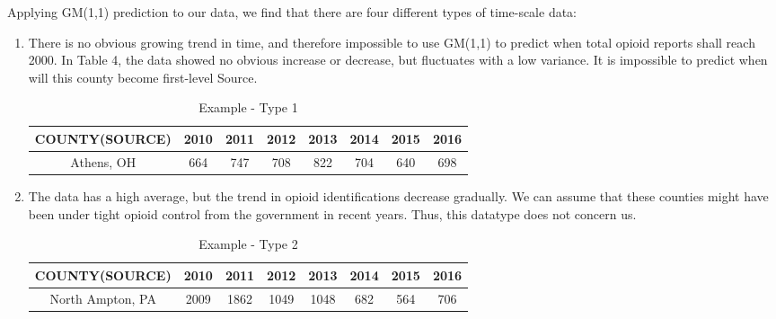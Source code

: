 Applying GM(1,1) prediction to our data, we find that there are four different types of time-scale data:
\begin{enumerate}
	\item There is no obvious growing trend in time, and therefore impossible to use GM(1,1) to predict when total opioid reports shall reach 2000. In Table 4, the data showed no obvious increase or decrease, but fluctuates with a low variance. It is impossible to predict when will this county become first-level Source.
	\begin{table}[H]
		\centering
		\begin{tabular}{|c|c|c|c|c|c|c|c|}
			\hline
			\rowcolor[HTML]{656565} 
			 {\color[HTML]{FFFFFF} \textbf{COUNTY(SOURCE)}} & {\color[HTML]{FFFFFF} \textbf{2010}} & {\color[HTML]{FFFFFF} \textbf{2011}} & {\color[HTML]{FFFFFF} \textbf{2012}} & {\color[HTML]{FFFFFF} \textbf{2013}} & {\color[HTML]{FFFFFF} \textbf{2014}} & {\color[HTML]{FFFFFF} \textbf{2015}} & {\color[HTML]{FFFFFF} \textbf{2016}}\\ \hline
			Athens, OH & 664	& 747 & 708 & 822 & 704	& 640 &	698 \\ \hline
		\end{tabular}
		\centering
		\caption{Example - Type 1 }
	\end{table}

	\item The data has a high average, but the trend in opioid identifications decrease gradually. We can assume that these counties might have been under tight opioid control from the government in recent years. Thus, this datatype does not concern us.
	\begin{table}[H]
		\centering
		\begin{tabular}{|c|c|c|c|c|c|c|c|}
			\hline
			\rowcolor[HTML]{656565} 
			{\color[HTML]{FFFFFF} \textbf{COUNTY(SOURCE)}} & {\color[HTML]{FFFFFF} \textbf{2010}} & {\color[HTML]{FFFFFF} \textbf{2011}} & {\color[HTML]{FFFFFF} \textbf{2012}} & {\color[HTML]{FFFFFF} \textbf{2013}} & {\color[HTML]{FFFFFF} \textbf{2014}} & {\color[HTML]{FFFFFF} \textbf{2015}} & {\color[HTML]{FFFFFF} \textbf{2016}}\\ \hline
			North Ampton, PA & 2009&1862&1049&1048&682&564&706 \\ \hline
		\end{tabular}
		\centering
		\caption{Example - Type 2}
	\end{table}
	

\end{enumerate}
